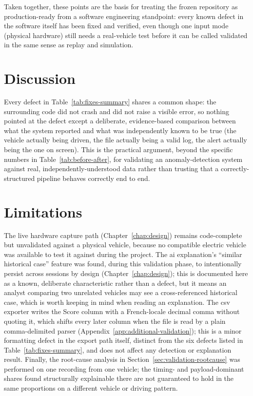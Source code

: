Taken together, these points are the basis for treating the frozen repository as production-ready from a software engineering standpoint: every known defect in the software itself has been fixed and verified, even though one input mode (physical hardware) still needs a real-vehicle test before it can be called validated in the same sense as replay and simulation.

\section{Discussion}

Every defect in Table~\ref{tab:fixes-summary} shares a common shape: the surrounding code did not crash and did not raise a visible error, so nothing pointed at the defect except a deliberate, evidence-based comparison between what the system reported and what was independently known to be true (the vehicle actually being driven, the file actually being a valid log, the alert actually being the one on screen). This is the practical argument, beyond the specific numbers in Table~\ref{tab:before-after}, for validating an anomaly-detection system against real, independently-understood data rather than trusting that a correctly-structured pipeline behaves correctly end to end.

\section{Limitations}

The live hardware capture path (Chapter~\ref{chap:design}) remains code-complete but unvalidated against a physical vehicle, because no compatible electric vehicle was available to test it against during the project. The \gls{ai} explanation's ``similar historical case'' feature was found, during this validation phase, to intentionally persist across sessions by design (Chapter~\ref{chap:design}); this is documented here as a known, deliberate characteristic rather than a defect, but it means an analyst comparing two unrelated vehicles may see a cross-referenced historical case, which is worth keeping in mind when reading an explanation. The \gls{csv} exporter writes the Score column with a French-locale decimal comma without quoting it, which shifts every later column when the file is read by a plain comma-delimited parser (Appendix~\ref{app:additional-validation}); this is a minor formatting defect in the export path itself, distinct from the six defects listed in Table~\ref{tab:fixes-summary}, and does not affect any detection or explanation result. Finally, the root-cause analysis in Section~\ref{sec:validation-rootcause} was performed on one recording from one vehicle; the timing- and payload-dominant shares found structurally explainable there are not guaranteed to hold in the same proportions on a different vehicle or driving pattern.

